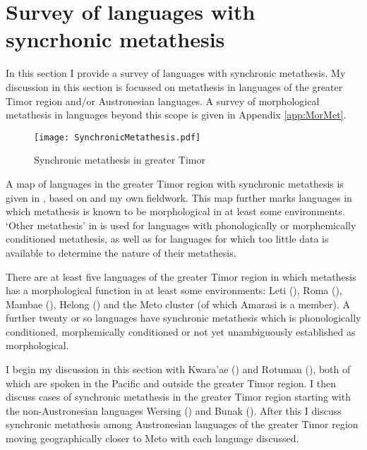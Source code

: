 \section{Survey of languages with syncrhonic metathesis}\label{sec:SurLanMet}
In this section I provide a survey of
languages with synchronic metathesis.
My discussion in this section is focussed on metathesis in languages
of the greater Timor region and/or Austronesian languages.
A survey of morphological metathesis in languages beyond this scope
is given in Appendix \ref{app:MorMet}.

\begin{figure}[h]
	\caption{Synchronic metathesis in greater Timor}\label{fig:CVMetTimReg}
	\texttt{[image: SynchronicMetathesis.pdf]}
\end{figure}

A map of languages in the greater Timor region
with synchronic metathesis is given in ,
based on \citet[135ff]{sc15} and my own fieldwork.
This map further marks languages in which metathesis
is known to be morphological in at least some environments.
`Other metathesis' in  is used for languages
with phonologically or morphemically conditioned metathesis,
as well as for languages for which too little data is available
to determine the nature of their metathesis.

There are at least five languages of the greater Timor region
in which metathesis has a morphological function in at least some environments:
Leti (), Roma (), Mambae (),
Helong () and the Meto cluster (of which Amarasi is a member).
A further twenty or so languages have synchronic
metathesis which is phonologically conditioned,
morphemically conditioned or not yet unambiguously established as morphological.


I begin my discussion in this section with Kwara'ae ()
and Rotuman (), both of which are spoken in the Pacific
and outside the greater Timor region.
I then discuss cases of synchronic metathesis
in the greater Timor region starting with the non-Austronesian
languages Wersing () and Bunak ().
After this I discuss synchronic metathesis among Austronesian
languages of the greater Timor region moving geographically
closer to Meto with each language discussed.

